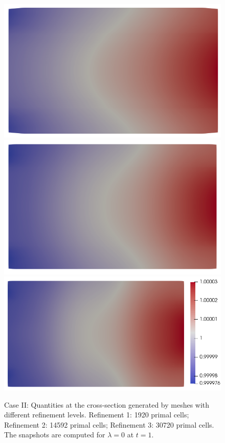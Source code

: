 \documentclass{article}
\begin{document}
\begin{figure}
\begin{minipage}{0.9\textwidth}
    \hspace{0.04cm}
    \includegraphics[scale=0.27]{slice_ni_T-1_lambda-0_8-2-2.png}\hspace{0.04cm}
    \includegraphics[scale=0.27]{slice_ni_T-1_lambda-0_16-3-3.png}\hspace{0.04cm}
    \includegraphics[scale=0.27]{slice_ni_T-1_lambda-0_32-3-4.png}
    \end{minipage}
    
    \caption{Case II: Quantities at the cross-section generated by meshes with different refinement levels. Refinement 1: 1920 primal cells; Refinement 2: 14592 primal cells; Refinement 3: 30720 primal cells. The snapshots are computed for $\lambda = 0$ at $t = 1$.}
    \label{fig:grid_study_3d_clip_lambda-0}
\end{figure}
\end{document}

